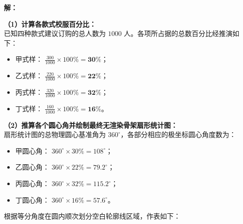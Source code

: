 \documentclass[12pt, a4paper]{ctexrep}
\begin{document}
\vspace{0.4cm}

\textbf{解：}

\textbf{（1）计算各款式校服百分比：} \\
已知四种款式建议订购的总人数为 $1000$ 人。各项所占据的总数百分比经推演如下：
\begin{itemize}
  \item 甲式样： $\frac{300}{1000} \times 100\% = \boldsymbol{30\%}$；
  \item 乙式样： $\frac{220}{1000} \times 100\% = \boldsymbol{22\%}$；
  \item 丙式样： $\frac{320}{1000} \times 100\% = \boldsymbol{32\%}$；
  \item 丁式样： $\frac{160}{1000} \times 100\% = \boldsymbol{16\%}$。
\end{itemize}

\textbf{（2）推算各个圆心角并绘制最终无渲染骨架扇形统计图：} \\
扇形统计图的总物理圆心基准角为 $360^\circ$，各部分相应的极坐标圆心角度数为：
\begin{itemize}
  \item 甲圆心角： $360^\circ \times 30\% = 108^\circ$；
  \item 乙圆心角： $360^\circ \times 22\% = 79.2^\circ$；
  \item 丙圆心角： $360^\circ \times 32\% = 115.2^\circ$；
  \item 丁圆心角： $360^\circ \times 16\% = 57.6^\circ$。
\end{itemize}

根据等分角度在圆内顺次划分空白轮廓线区域，作表如下：
\end{document}
